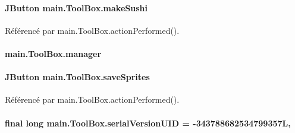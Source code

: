 \paragraph[{make\+Sushi}]{\setlength{\rightskip}{0pt plus 5cm}J\+Button main.\+Tool\+Box.\+make\+Sushi\hspace{0.3cm}{\ttfamily [private]}}\label{classmain_1_1ToolBox_a1ab2e723f8e1f783109242ccc1b811c1}


Référencé par main.\+Tool\+Box.\+action\+Performed().

\hypertarget{classmain_1_1ToolBox_a10d9cda5ab25a1fccd170b68d0a41e2f}{}
\paragraph[{manager}]{ main.\+Tool\+Box.\+manager\hspace{0.3cm}{\ttfamily [private]}}\label{classmain_1_1ToolBox_a10d9cda5ab25a1fccd170b68d0a41e2f}
\hypertarget{classmain_1_1ToolBox_a009d9ace3584b9153963e345708fe718}{}
\paragraph[{save\+Sprites}]{\setlength{\rightskip}{0pt plus 5cm}J\+Button main.\+Tool\+Box.\+save\+Sprites\hspace{0.3cm}{\ttfamily [private]}}\label{classmain_1_1ToolBox_a009d9ace3584b9153963e345708fe718}


Référencé par main.\+Tool\+Box.\+action\+Performed().

\hypertarget{classmain_1_1ToolBox_aa817e24365a3bf91a4ef5d99b45d44f2}{}
\paragraph[{serial\+Version\+U\+I\+D}]{\setlength{\rightskip}{0pt plus 5cm}final long main.\+Tool\+Box.\+serial\+Version\+U\+I\+D = -\/343788682534799357\+L\hspace{0.3cm}{\ttfamily [static]}, {\ttfamily [private]}}\label{classmain_1_1ToolBox_aa817e24365a3bf91a4ef5d99b45d44f2}
\hypertarget{classmain_1_1ToolBox_ab4249615a8635a1ba3790c3127cc54e4}{}
